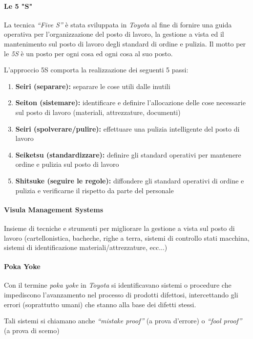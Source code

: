 \paragraph{Le 5 "S"}
La tecnica \textit{“Five S”} è stata sviluppata in \textit{Toyota} al fine di fornire una guida operativa per l’organizzazione del posto di lavoro, la gestione a vista ed il mantenimento sul posto di lavoro degli standard di ordine e pulizia. Il motto per le \textit{5S} è un posto per ogni cosa ed ogni cosa al suo posto.

L’approccio 5S comporta la realizzazione dei seguenti 5 passi:
\begin{enumerate}
	\item \textbf{Seiri (separare):} separare le cose utili dalle inutili
	\item \textbf{Seiton (sistemare):} identificare e definire l’allocazione delle cose necessarie sul posto di lavoro (materiali, attrezzature, documenti)
	\item \textbf{Seiri (spolverare/pulire):} effettuare una pulizia intelligente del posto di lavoro
	\item \textbf{Seiketsu (standardizzare):} definire gli standard operativi per mantenere ordine e pulizia sul posto di lavoro
	\item \textbf{Shitsuke (seguire le regole):} diffondere gli standard operativi di ordine e pulizia e verificarne il rispetto da parte del personale
\end{enumerate}

\paragraph{Visula Management Systems}
Insieme di tecniche e strumenti per migliorare la gestione a vista sul posto di lavoro (cartellonistica, bacheche, righe a terra, sistemi di controllo stati macchina, sistemi di identificazione materiali/attrezzature, ecc...)


\paragraph{Poka Yoke}
Con il termine \textit{poka yoke} in \textit{Toyota} si identificavano sistemi o procedure che impediscono l’avanzamento nel processo di prodotti difettosi, intercettando gli errori (soprattutto umani) che stanno alla base dei difetti stessi.

Tali sistemi si chiamano anche \textit{“mistake proof”} (a prova d’errore) o \textit{“fool proof”} (a prova di scemo)



